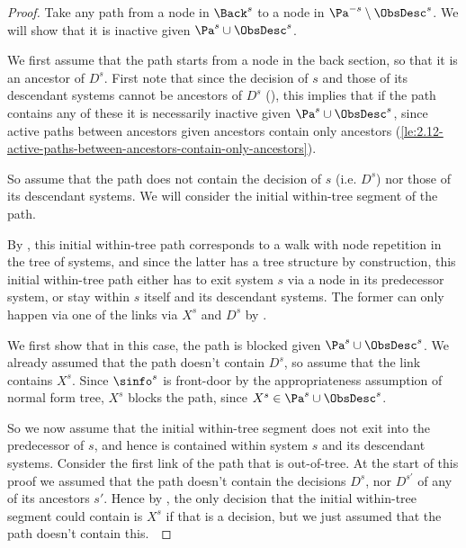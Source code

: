 \newcommand{\OutsideParents}{\Pa^{-s} \setminus \ObsDesc^s}
\newcommand{\InsideParents}{\Pa^{s} \cup \ObsDesc^s}
\begin{proof} Take any path from a node in $\Back^s$ to a node in $\OutsideParents$. We will show that it is inactive given $\InsideParents$.

We first assume that the path starts from a node in the back section, so that it is an ancestor of $D^s$.
First note that since the decision of $s$ and those of its descendant systems cannot be ancestors of $D^s$ (), this implies that if the path contains any of these it is necessarily inactive given {$\InsideParents$}, since active paths between ancestors given ancestors contain only ancestors (\cref{le:2.12-active-paths-between-ancestors-contain-only-ancestors}).

So assume that the path does not contain the decision of $s$ (i.e. $D^s$) nor those of its descendant systems. We will consider the initial within-tree segment of the path. 

By , this initial within-tree path corresponds to a walk with node repetition in the tree of systems, and since the latter has a tree structure by construction, this initial within-tree path either has to exit system $s$ via a node in its predecessor system, or stay within $s$ itself and its descendant systems. 
The former can only happen via one of the links via $X^s$ and $D^s$ by .


We first show that in this case, the path is blocked given $\InsideParents$. We already assumed that the path doesn’t contain $D^s$, so assume that the link contains $X^s$. Since $\sinfo^s$ is front-door by the appropriateness assumption of normal form tree, $X^s$ blocks the path, since $X^s\in \InsideParents$. 


So we now assume that the initial within-tree segment does not exit into the predecessor of $s$, and hence is contained within system $s$ and its descendant systems. Consider the first link of the path that is out-of-tree. At the start of this proof we assumed that the path doesn't contain the decisions $D^s$, nor $D^{s'}$ of any of its ancestors $s'$. Hence by , the only decision that the initial within-tree segment could contain is $X^s$ if that is a decision, but we just assumed that the path doesn't contain this.~


\end{proof}
